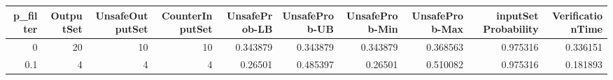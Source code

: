 \begin{tabular}{rrrrrrrrrr}
\hline
   p\_filter &   OutputSet &   UnsafeOutputSet &   CounterInputSet &   UnsafeProb-LB &   UnsafeProb-UB &   UnsafeProb-Min &   UnsafeProb-Max &   inputSet Probability &   VerificationTime \\
\hline
        0   &          20 &                10 &                10 &        0.343879 &        0.343879 &         0.343879 &         0.368563 &               0.975316 &           0.336151 \\
        0.1 &           4 &                 4 &                 4 &        0.26501  &        0.485397 &         0.26501  &         0.510082 &               0.975316 &           0.181893 \\
\hline
\end{tabular}
